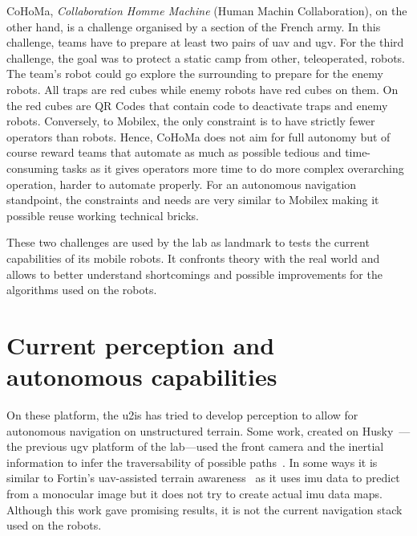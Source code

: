 CoHoMa, \textit{Collaboration Homme Machine} (Human Machin Collaboration), on the other hand, is a challenge organised
by a section of the French army.
In this challenge, teams have to prepare at least two pairs of \gls{uav} and \gls{ugv}.
For the third challenge, the goal was to protect a static camp from other, teleoperated, robots.
The team's robot could go explore the surrounding to prepare for the enemy robots.
All traps are red cubes while enemy robots have red cubes on them.
On the red cubes are QR Codes that contain code to deactivate traps and enemy robots.
Conversely, to Mobilex, the only constraint is to have strictly fewer operators than robots.
Hence, CoHoMa does not aim for full autonomy but of course reward teams that automate as much as possible tedious
and time-consuming tasks as it gives operators more time to do more complex overarching operation, harder to
automate properly.
For an autonomous navigation standpoint, the constraints and needs are very similar to Mobilex making it possible
reuse working technical bricks.

These two challenges are used by the lab as landmark to tests the current capabilities of its mobile robots.
It confronts theory with the real world and allows to better understand shortcomings and possible improvements
for the algorithms used on the robots.


\section{Current perception and autonomous capabilities}\label{sec:current-perception-and-autonomous-capabilities}

On these platform, the \gls{u2is} has tried to develop perception to allow for autonomous navigation on unstructured terrain.
Some work, created on Husky~\cite{noauthor_husky_nodate}---the previous
\gls{ugv} platform of the lab---used the front camera and the inertial information to infer the traversability of
possible paths~\cite{thomas_whojospatially-coherent-costmap_2024}.
In some ways it is similar to Fortin's \gls{uav}-assisted terrain awareness~\cite{fortin_uav-assisted_2024} as it uses \gls{imu} data to predict from a monocular image but
it does not try to create actual \gls{imu} data maps.
Although this work gave promising results, it is not the current navigation stack used on the robots.

